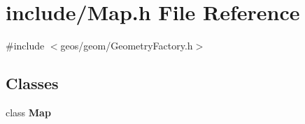 \section{include/\+Map.h File Reference}
\label{_map_8h}
{\ttfamily \#include $<$geos/geom/\+Geometry\+Factory.\+h$>$}\newline
\subsection*{Classes}
\begin{DoxyCompactItemize}
\item 
class \textbf{ Map}
\end{DoxyCompactItemize}
